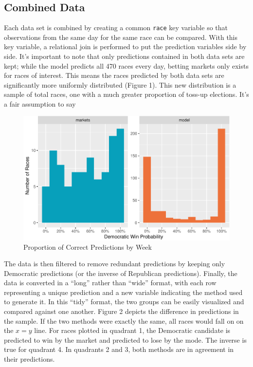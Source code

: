 \documentclass[11pt,]{article}
\begin{document}
\hypertarget{combined-data}{%
\subsection{Combined Data}\label{combined-data}}

Each data set is combined by creating a common \texttt{race} key
variable so that observations from the same day for the same race can be
compared. With this key variable, a relational join is performed to put
the prediction variables side by side. It's important to note that only
predictions contained in both data sets are kept; while the model
predicts all 470 races every day, betting markets only exists for races
of interest. This means the races predicted by both data sets are
significantly more uniformly distributed (Figure 1). This new
distribution is a sample of total races, one with a much greater
proportion of toss-up elections. It's a fair assumption to say

\begin{figure}
\centering
\includegraphics{paper_files/figure-latex/plot_dist-1.pdf}
\caption{Proportion of Correct Predictions by Week}
\end{figure}

The data is then filtered to remove redundant predictions by keeping
only Democratic predictions (or the inverse of Republican predictions).
Finally, the data is converted in a ``long'' rather than ``wide''
format, with each row representing a unique prediction and a new
variable indicating the method used to generate it. In this ``tidy''
format, the two groups can be easily visualized and compared against one
another. Figure 2 depicts the difference in predictions in the sample.
If the two methods were exactly the same, all races would fall on on the
\(x = y\) line. For races plotted in quadrant 1, the Democratic
candidate is predicted to win by the market and predicted to lose by the
mode. The inverse is true for quadrant 4. In quadrants 2 and 3, both
methods are in agreement in their predictions.
\end{document}
